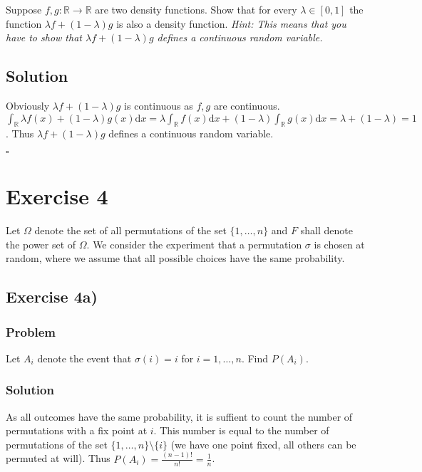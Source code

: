 \documentclass[a4paper,10pt]{article}
\begin{document}
Suppose $f,g : \mathbb{R} \rightarrow \mathbb{R}$  are two density functions. Show that for every $ \lambda \in [0, 1]$ the function $\lambda f + (1 - \lambda) g $ is also a density function.
\textit{Hint: This means that you have to show that $\lambda f + (1 - \lambda) g $  defines a continuous random variable. }

\subsection{Solution}

Obviously $\lambda f + (1 - \lambda) g $ is continuous as $f, g$ are continuous.
$\int_{\mathbb{R}}{\lambda f(x) + (1 - \lambda) g(x)\mathrm{d}x} = \lambda \int_{\mathbb{R}}{ f(x) \mathrm{d}x} + (1 - \lambda) \int_{\mathbb{R}}{ g(x)\mathrm{d}x} = \lambda + (1 - \lambda) = 1$. Thus $\lambda f + (1 - \lambda) g $ defines a continuous random variable.

{\raggedleft{}$\square$}

\section{Exercise 4}

Let $\Omega$ denote the set of all permutations of the set $\{1,\dots,n\}$ and $F$ shall denote the power set of $\Omega$. We consider the experiment that a permutation $\sigma$ is chosen at random, where we assume that all possible choices have the same probability.

\subsection{Exercise 4a)}

\subsubsection{Problem}
Let $A_i$ denote the event that $\sigma(i) = i$ for $i = 1,\dots,n$. Find $P(A_i)$.

\subsubsection{Solution}
As all outcomes have the same probability, it is suffient to count the number of permutations with a fix point at $i$. This number is equal to the number of permutations of the set $\{1,\dots,n\} \setminus \{i\}$ (we have one point fixed, all others can be permuted at will). Thus $P(A_i) = \frac{(n-1)!}{n!} = \frac{1}{n}$.
\end{document}
